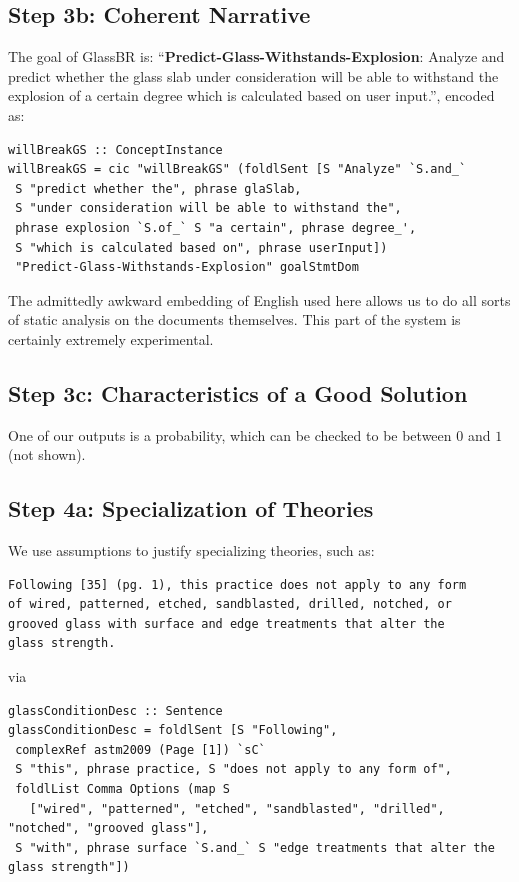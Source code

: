 \documentclass[sigconf,review,anonymous=false]{acmart}
\makeatletter
\newcommand{\verbatimfont}[1]{\renewcommand{\verbatim@font}{\ttfamily#1}}
\makeatother
\begin{document}
\subsection*{Step 3b: Coherent Narrative}

The goal of GlassBR is:
``\textbf{Predict-Glass-Withstands-Explosion}: Analyze and predict whether the glass slab
under consideration will be able to withstand the explosion of a certain degree
which is calculated based on user input.'', encoded as:

\begin{lstlisting}
willBreakGS :: ConceptInstance
willBreakGS = cic "willBreakGS" (foldlSent [S "Analyze" `S.and_`
 S "predict whether the", phrase glaSlab, 
 S "under consideration will be able to withstand the", 
 phrase explosion `S.of_` S "a certain", phrase degree_',
 S "which is calculated based on", phrase userInput])
 "Predict-Glass-Withstands-Explosion" goalStmtDom
\end{lstlisting}

The admittedly awkward embedding of English used here allows us to do all sorts of
static analysis on the documents themselves. This part of the system is certainly
extremely experimental.

\subsection*{Step 3c: Characteristics of a Good Solution}

One of our outputs is a probability, which can be checked to be between $0$ and $1$
(not shown).

\subsection*{Step 4a: Specialization of Theories}

We use assumptions to justify specializing theories, such as:
\verbatimfont{\small}
\begin{verbatim}
Following [35] (pg. 1), this practice does not apply to any form 
of wired, patterned, etched, sandblasted, drilled, notched, or 
grooved glass with surface and edge treatments that alter the 
glass strength.
\end{verbatim}
\noindent via
\begin{lstlisting}
glassConditionDesc :: Sentence
glassConditionDesc = foldlSent [S "Following", 
 complexRef astm2009 (Page [1]) `sC` 
 S "this", phrase practice, S "does not apply to any form of", 
 foldlList Comma Options (map S 
   ["wired", "patterned", "etched", "sandblasted", "drilled", "notched", "grooved glass"], 
 S "with", phrase surface `S.and_` S "edge treatments that alter the glass strength"])
\end{lstlisting}
\end{document}
